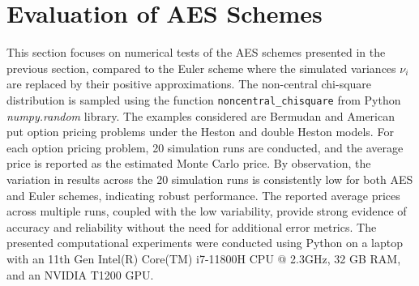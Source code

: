 \documentclass[]{interact}
\theoremstyle{plain}%
\theoremstyle{definition}
\theoremstyle{remark}
\begin{document}





\section{Evaluation of AES Schemes}
This section focuses on numerical tests of the AES schemes presented in the previous section, compared to the Euler scheme where the simulated variances $\nu_{i}$ are replaced by their positive approximations. The non-central chi-square distribution is sampled using the function \texttt{noncentral\_chisquare} from Python \textit{numpy.random} library.  The examples considered are Bermudan and American put option pricing problems under the Heston and double Heston models. For each option pricing problem, 20 simulation runs are conducted, and the average price is reported as the estimated Monte Carlo price. By observation, the variation in results across the 20 simulation runs is consistently low for both AES and Euler schemes, indicating robust performance. The reported average prices across multiple runs, coupled with the low variability, provide strong evidence of accuracy and reliability without the need for additional error metrics. The presented computational experiments were conducted using Python on a laptop with an 11th Gen Intel(R) Core(TM) i7-11800H CPU @ 2.3GHz, 32 GB RAM, and an NVIDIA T1200 GPU.
 
\end{document}
